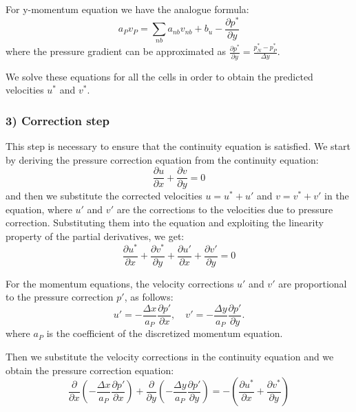 \documentclass{article}
\begin{document}
For y-momentum equation we have the analogue formula:
\begin{equation}
  a_{P}v_{P}=\sum_{nb}a_{nb}v_{nb}+b_{u}-\frac{\partial p^{*}}{\partial y}
\end{equation}
where  the pressure gradient can be approximated as $\frac{\partial p^{*}}{\partial y}=\frac{p_{N}^{*}-p_{P}^{*}}{\Delta y}$.

We solve these equations for all the cells in order to obtain the predicted velocities $u^*$ and $v^*$.

\subsubsection*{3) Correction step}
This step is necessary to ensure that the continuity equation is satisfied. 
We start by deriving the pressure correction equation from the continuity equation:
\begin{equation}
  \frac{\partial u}{\partial x} + \frac{\partial v}{\partial y} = 0
\end{equation}
and then we substitute the corrected velocities $u = u^* + u'$ and $v = v^* + v'$ in the equation, where $u'$ and $v'$ are the corrections to the velocities due to pressure correction. 
Substituting them into the equation and exploiting the linearity property of the partial derivatives, we get:
\begin{equation}
  \frac{\partial u^*}{\partial x} + \frac{\partial v^*}{\partial y} + \frac{\partial u'}{\partial x} + \frac{\partial v'}{\partial y} = 0
\end{equation}

For the momentum equations, the velocity corrections $u'$ and $v'$ are proportional to the pressure correction $p'$, as follows:
\begin{equation}
  u' = -\frac{\Delta x}{a_P} \frac{\partial p'}{\partial x}, \quad v' = -\frac{\Delta y}{a_P} \frac{\partial p'}{\partial y}.
\end{equation}
where $a_P$ is the coefficient of the discretized momentum equation.

Then we substitute the velocity corrections in the continuity equation and we obtain the pressure correction equation:
\begin{equation}
  \frac{\partial}{\partial x}\left(-\frac{\Delta x}{a_P}\frac{\partial p'}{\partial x}\right) + \frac{\partial}{\partial y}\left(-\frac{\Delta y}{a_P}\frac{\partial p'}{\partial y}\right) = -\left(\frac{\partial u^*}{\partial x} + \frac{\partial v^*}{\partial y}\right)
\end{equation}
\end{document}
